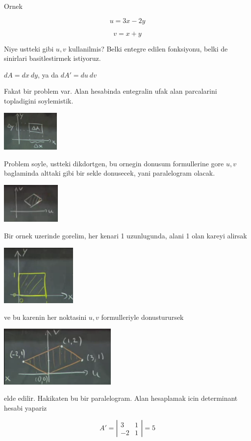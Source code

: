 \documentclass[12pt,fleqn]{article}\usepackage{../common}
\begin{document}
Ornek 

\[ u = 3x - 2y \]

\[ v = x + y \]

Niye ustteki gibi $u,v$ kullanilmis? Belki entegre edilen fonksiyonu, belki
de sinirlari basitlestirmek istiyoruz. 

$dA = dx \ dy$, ya da $dA' = du \ dv$ 

Fakat bir problem var. Alan hesabinda entegralin ufak alan parcalarini
topladigini soylemistik. 

\includegraphics[height=2cm]{18_2.png}

Problem soyle, ustteki dikdortgen, bu ornegin donusum formullerine gore
$u,v$ baglaminda alttaki gibi bir sekle donusecek, yani paralelogram
olacak. 

\includegraphics[height=2cm]{18_3.png}

Bir ornek uzerinde gorelim, her kenari 1 uzunlugunda, alani 1 olan kareyi
alirsak

\includegraphics[height=3cm]{18_4.png}

ve bu karenin her noktasini $u,v$ formulleriyle donusturursek

\includegraphics[height=3cm]{18_5.png}

elde edilir. Hakikaten bu bir paralelogram. Alan hesaplamak icin
determinant hesabi yapariz

\[ A' = 
\left|\begin{array}{rr}
3 & 1 \\
-2 & 1
\end{array}\right| = 5
 \]
\end{document}
